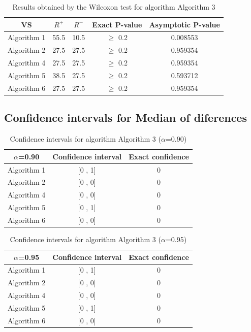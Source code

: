 \documentclass[a4paper,10pt]{article}
\begin{document}
\begin{table}[!htp]
\centering\small
\begin{tabular}{
|c|c|c|c|c|}
\hline
 VS & $R^{+}$ & $R^{-}$ & Exact P-value & Asymptotic P-value \\ \hline 
Algorithm 1 & 55.5 & 10.5 & $\geq$ 0.2 & 0.008553\\ \hline 
Algorithm 2 & 27.5 & 27.5 & $\geq$ 0.2 & 0.959354\\ \hline 
Algorithm 4 & 27.5 & 27.5 & $\geq$ 0.2 & 0.959354\\ \hline 
Algorithm 5 & 38.5 & 27.5 & $\geq$ 0.2 & 0.593712\\ \hline 
Algorithm 6 & 27.5 & 27.5 & $\geq$ 0.2 & 0.959354\\ \hline 

\end{tabular}
\caption{Results obtained by the Wilcoxon test for algorithm Algorithm 3}
\end{table}

\subsection{Confidence intervals for Median of diferences}

\begin{table}[!htp]
\centering\small
\begin{tabular}{
|c|c|c|}
\hline
 $\alpha$=0.90 & Confidence interval & Exact confidence \\ \hline 
Algorithm 1 & [0 , 1] & 0\\ \hline 
Algorithm 2 & [0 , 0] & 0\\ \hline 
Algorithm 4 & [0 , 0] & 0\\ \hline 
Algorithm 5 & [0 , 1] & 0\\ \hline 
Algorithm 6 & [0 , 0] & 0\\ \hline 

\end{tabular}
\caption{Confidence intervals for algorithm Algorithm 3 ($\alpha$=0.90)}
\end{table}
\begin{table}[!htp]
\centering\small
\begin{tabular}{
|c|c|c|}
\hline
 $\alpha$=0.95 & Confidence interval & Exact confidence \\ \hline 
Algorithm 1 & [0 , 1] & 0\\ \hline 
Algorithm 2 & [0 , 0] & 0\\ \hline 
Algorithm 4 & [0 , 0] & 0\\ \hline 
Algorithm 5 & [0 , 1] & 0\\ \hline 
Algorithm 6 & [0 , 0] & 0\\ \hline 

\end{tabular}
\caption{Confidence intervals for algorithm Algorithm 3 ($\alpha$=0.95)}
\end{table}
\end{document}
